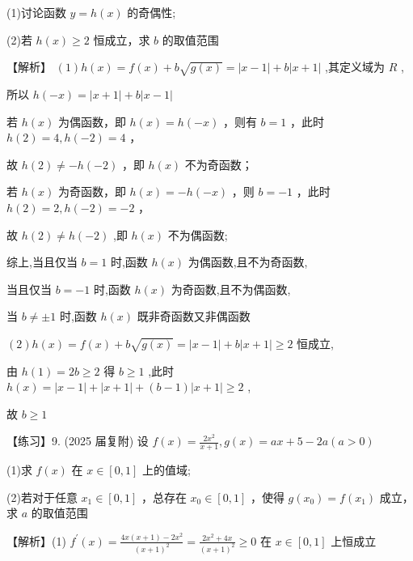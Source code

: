 \documentclass[10pt]{article}
\begin{document}
(1)讨论函数 \(y = h\left( x\right)\) 的奇偶性;

(2)若 \(h\left( x\right)  \geq  2\) 恒成立，求 \(b\) 的取值范围

【解析】 \(\left( 1\right) h\left( x\right)  = f\left( x\right)  + b\sqrt{g\left( x\right) } = \left| {x - 1}\right|  + b\left| {x + 1}\right|\) ,其定义域为 \(R\) ,

所以 \(h\left( {-x}\right)  = \left| {x + 1}\right|  + b\left| {x - 1}\right|\)

若 \(h\left( x\right)\) 为偶函数，即 \(h\left( x\right)  = h\left( {-x}\right)\) ，则有 \(b = 1\) ，此时 \(h\left( 2\right)  = 4,h\left( {-2}\right)  = 4\) ，

故 \(h\left( 2\right)  \neq   - h\left( {-2}\right)\) ，即 \(h\left( x\right)\) 不为奇函数；

若 \(h\left( x\right)\) 为奇函数，即 \(h\left( x\right)  =  - h\left( {-x}\right)\) ，则 \(b =  - 1\) ，此时 \(h\left( 2\right)  = 2,h\left( {-2}\right)  =  - 2\) ，

故 \(h\left( 2\right)  \neq  h\left( {-2}\right)\) ,即 \(h\left( x\right)\) 不为偶函数;

综上,当且仅当 \(b = 1\) 时,函数 \(h\left( x\right)\) 为偶函数,且不为奇函数,

当且仅当 \(b =  - 1\) 时,函数 \(h\left( x\right)\) 为奇函数,且不为偶函数,

当 \(b \neq   \pm  1\) 时,函数 \(h\left( x\right)\) 既非奇函数又非偶函数

\(\left( 2\right) h\left( x\right)  = f\left( x\right)  + b\sqrt{g\left( x\right) } = \left| {x - 1}\right|  + b\left| {x + 1}\right|  \geq  2\) 恒成立,

由 \(h\left( 1\right)  = {2b} \geq  2\) 得 \(b \geq  1\) ,此时 \(h\left( x\right)  = \left| {x - 1}\right|  + \left| {x + 1}\right|  + \left( {b - 1}\right) \left| {x + 1}\right|  \geq  2\) ,

故 \(b \geq  1\)

【练习】9. (2025 届复附) 设 \(f\left( x\right)  = \frac{2{x}^{2}}{x + 1},g\left( x\right)  = {ax} + 5 - {2a}\left( {a > 0}\right)\)

(1)求 \(f\left( x\right)\) 在 \(x \in  \left\lbrack  {0,1}\right\rbrack\) 上的值域;

(2)若对于任意 \({x}_{1} \in  \left\lbrack  {0,1}\right\rbrack\) ，总存在 \({x}_{0} \in  \left\lbrack  {0,1}\right\rbrack\) ，使得 \(g\left( {x}_{0}\right)  = f\left( {x}_{1}\right)\) 成立，求 \(a\) 的取值范围

【解析】(1) \({f}^{\prime }\left( x\right)  = \frac{{4x}\left( {x + 1}\right)  - 2{x}^{2}}{{\left( x + 1\right) }^{2}} = \frac{2{x}^{2} + {4x}}{{\left( x + 1\right) }^{2}} \geq  0\) 在 \(x \in  \left\lbrack  {0,1}\right\rbrack\) 上恒成立
\end{document}
